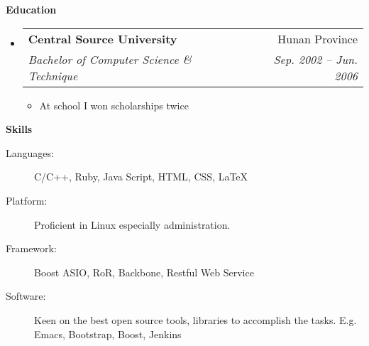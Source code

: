\documentclass[letterpaper,11pt]{article}
\makeatletter
\newcommand{\resitem}[1]{\item #1 \vspace{-2pt}}
\newcommand{\resheading}[1]{{\large \colorbox{mygrey}{\begin{minipage}{\textwidth}{\textbf{#1 \vphantom{p\^{E}}}}\end{minipage}}}}
\newcommand{\ressubheading}[4]{
\begin{tabular*}{6.5in}{l@{\extracolsep{\fill}}r}
		\textbf{#1} & #2 \\
		\textit{#3} & \textit{#4} \\
\end{tabular*}\vspace{-6pt}}
\makeatother
\begin{document}
\resheading{Education}
\begin{itemize}
\item \ressubheading{Central Source University}{Hunan Province}{%
    Bachelor of Computer Science \& Technique}{Sep. 2002 -- Jun. 2006}

  { \footnotesize
    \begin{itemize}
      \resitem{At school I won scholarships twice}
    \end{itemize}
  }

\end{itemize} %

\resheading{Skills}
	\begin{description}
		\item[Languages:] { \footnotesize C/C++, Ruby, Java Script, HTML, CSS, \LaTeX }
		\item[Platform:] { \footnotesize Proficient in Linux especially administration. }
    \item[Framework:] { \footnotesize Boost ASIO, RoR, Backbone, Restful Web Service}
		\item[Software:] { \footnotesize Keen on the best open source tools,
          libraries to accomplish the tasks. E.g. Emacs, Bootstrap, Boost, Jenkins }
	\end{description} %
\end{document}
